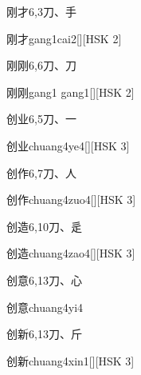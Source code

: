 \begin{entry}{刚才}{6,3}{⼑、⼿}
  \begin{phonetics}{刚才}{gang1cai2}[][HSK 2]
  \end{phonetics}
\end{entry}

\begin{entry}{刚刚}{6,6}{⼑、⼑}
  \begin{phonetics}{刚刚}{gang1 gang1}[][HSK 2]
  \end{phonetics}
\end{entry}

\begin{entry}{创业}{6,5}{⼑、⼀}
  \begin{phonetics}{创业}{chuang4ye4}[][HSK 3]
  \end{phonetics}
\end{entry}

\begin{entry}{创作}{6,7}{⼑、⼈}
  \begin{phonetics}{创作}{chuang4zuo4}[][HSK 3]
  \end{phonetics}
\end{entry}

\begin{entry}{创造}{6,10}{⼑、⾡}
  \begin{phonetics}{创造}{chuang4zao4}[][HSK 3]
  \end{phonetics}
\end{entry}

\begin{entry}{创意}{6,13}{⼑、⼼}
  \begin{phonetics}{创意}{chuang4yi4}
  \end{phonetics}
\end{entry}

\begin{entry}{创新}{6,13}{⼑、⽄}
  \begin{phonetics}{创新}{chuang4xin1}[][HSK 3]
  \end{phonetics}
\end{entry}


